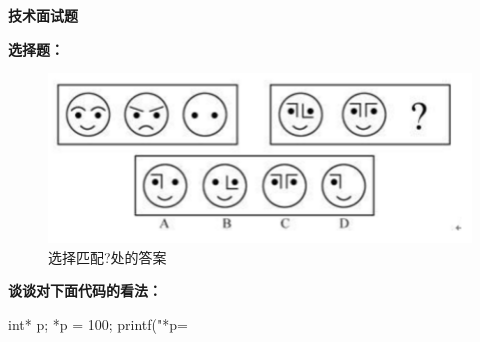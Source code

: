 \documentclass[12pt]{exam}
\begin{document}
	\large
	\linespread{1.6} \selectfont
	
	\begin{center}
		\textbf{\large 技术面试题}
	\end{center}
	
	\begin{questions}
		
		\question
		\textbf{选择题：}
		\begin{figure}[htbp]
			\centering
			\includegraphics[width=\linewidth]{XOR}
			\caption{选择匹配?处的答案}
		\end{figure}
		
		\question
		\textbf{谈谈对下面代码的看法：}
		\begin{cppcode}
int* p;
*p = 100;
printf("*p=%
		\end{cppcode}
	\end{questions}
	
\end{document}
